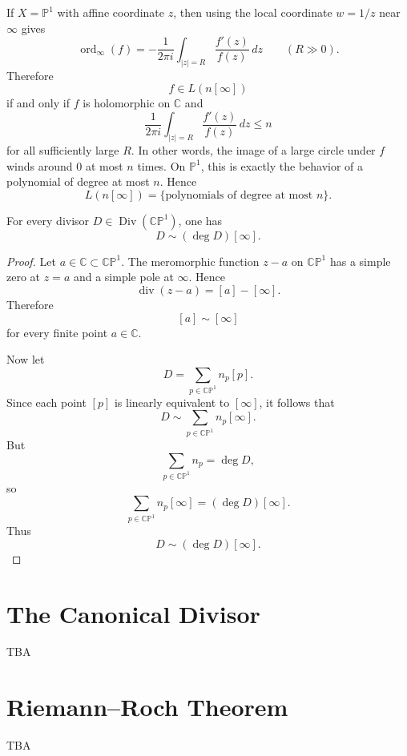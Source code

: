 \documentclass[11pt,openany]{article}
\newcommand{\CP}{\mathbb{CP}}
\newcommand{\OO}{\mathcal{O}}
\newcommand{\Div}{\operatorname{Div}}
\newcommand{\CPone}{\CP^1}
\renewcommand{\div}{\operatorname{div}}
\begin{document}
If $X=\mathbb{P}^1$ with affine coordinate $z$, then using the local coordinate $w=1/z$ near $\infty$ gives
\[
\operatorname{ord}_\infty(f)
=
-\frac{1}{2\pi i}\int_{|z|=R}\frac{f'(z)}{f(z)}\,dz
\qquad (R\gg 0).
\]
Therefore
\[
f\in L(n[\infty])
\]
if and only if $f$ is holomorphic on $\mathbb{C}$ and
\[
\frac{1}{2\pi i}\int_{|z|=R}\frac{f'(z)}{f(z)}\,dz\le n
\]
for all sufficiently large $R$. In other words, the image of a large circle under $f$ winds around $0$ at most $n$ times. On $\mathbb{P}^1$, this is exactly the behavior of a polynomial of degree at most $n$. Hence
\[
L(n[\infty])=\{ \text{polynomials of degree at most } n\}.
\]

\newpage

\begin{proposition}
	For every divisor $D\in \Div(\mathbb{CP}^1)$, one has
	\[
	D\sim (\deg D)[\infty].
	\]
\end{proposition}

\begin{proof}
	Let $a\in \mathbb C\subset \mathbb{CP}^1$. The meromorphic function $z-a$ on $\mathbb{CP}^1$ has a simple zero at $z=a$ and a simple pole at $\infty$. Hence
	\[
	\div(z-a)=[a]-[\infty].
	\]
	Therefore
	\[
	[a]\sim [\infty]
	\]
	for every finite point $a\in\mathbb C$.
	
	Now let
	\[
	D=\sum_{p\in \mathbb{CP}^1} n_p[p].
	\]
	Since each point $[p]$ is linearly equivalent to $[\infty]$, it follows that
	\[
	D\sim \sum_{p\in \mathbb{CP}^1} n_p[\infty].
	\]
	But
	\[
	\sum_{p\in \mathbb{CP}^1} n_p=\deg D,
	\]
	so
	\[
	\sum_{p\in \mathbb{CP}^1} n_p[\infty]=(\deg D)[\infty].
	\]
	Thus
	\[
	D\sim (\deg D)[\infty].
	\]
\end{proof}

\newpage


\section{The Canonical Divisor}
TBA

\section{Riemann--Roch Theorem}
TBA
\end{document}
